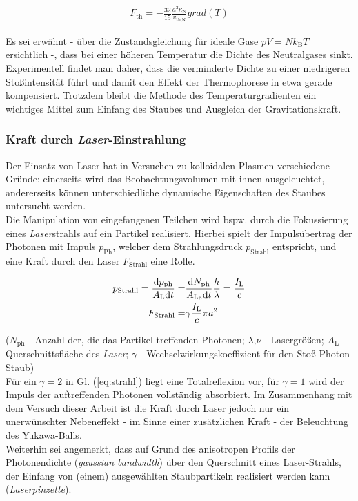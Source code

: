 \documentclass[numbers=noenddot,a4paper]{scrartcl}
\newcommand{\diff}{\textnormal{d}}
\newcommand{\ix}[1]{_\text{#1}}
\newcommand{\tilt}[1]{\textit{#1}}
\newcommand{\grad}[1]{\textit{grad}\left(#1\right)}
\begin{document}
				\begin{align}
					F\ix{th}=-\frac{32}{15}\frac{a^2 \kappa\ix{N}}{v\ix{th,N}}\grad{T} \label{eq:therm}
				\end{align}

			Es sei erwähnt -  über die Zustandsgleichung für ideale Gase $pV=Nk\ix{B}T$ ersichtlich -, dass bei einer höheren Temperatur die Dichte des Neutralgases sinkt. Experimentell findet man daher, dass die verminderte Dichte zu einer niedrigeren Stoßintensität führt und damit den Effekt der Thermophorese in etwa gerade kompensiert. Trotzdem bleibt die Methode des Temperaturgradienten ein wichtiges Mittel zum Einfang des Staubes und Ausgleich der Gravitationskraft.

		\subsubsection{Kraft durch \tilt{Laser}-Einstrahlung}\label{subsub:laser}

			Der Einsatz von Laser hat in Versuchen zu kolloidalen Plasmen verschiedene Gründe: einerseits wird das Beobachtungsvolumen mit ihnen ausgeleuchtet, andererseits können unterschiedliche dynamische Eigenschaften des Staubes untersucht werden.\\
			Die Manipulation von eingefangenen Teilchen wird bspw. durch die Fokussierung eines \tilt{Laser}strahls auf ein Partikel realisiert. Hierbei spielt der Impulsübertrag der Photonen mit Impuls $p\ix{Ph}$, welcher dem Strahlungsdruck $p\ix{Strahl}$ entspricht, und eine Kraft durch den Laser $F\ix{Strahl}$ \cite{Ashkin70} eine Rolle.

				\begin{align}
					p\ix{Strahl}=\frac{\diff p\ix{ph}}{A\ix{L}\diff t}=&\frac{\diff N\ix{ph}}{A\ix{La}\diff t}\frac{h}{\lambda}=\frac{I\ix{L}}{c} \nonumber \\
					F\ix{Strahl}=&\gamma\frac{I\ix{L}}{c}\pi a^2 \label{eq:strahl}
				\end{align}

			($N\ix{ph}$ - Anzahl der, die das Partikel treffenden Photonen; $\lambda$,$\nu$ - Lasergrößen; $A\ix{L}$ - Querschnittsfläche des \tilt{Laser}; $\gamma$ - Wechselwirkungskoeffizient für den Stoß Photon-Staub)\\
			Für ein $\gamma=2$ in Gl. (\ref{eq:strahl}) liegt eine Totalreflexion vor, für $\gamma=1$ wird der Impuls der auftreffenden Photonen vollständig absorbiert. Im Zusammenhang mit dem Versuch dieser Arbeit ist die Kraft durch Laser jedoch nur ein unerwünschter Nebeneffekt - im Sinne einer zusätzlichen Kraft - der Beleuchtung des Yukawa-Balls.\\
			Weiterhin sei angemerkt, dass auf Grund des anisotropen Profils der Photonendichte (\tilt{gaussian bandwidth}) über den Querschnitt eines Laser-Strahls, der Einfang von (einem) ausgewählten Staubpartikeln realisiert werden kann (\tilt{Laserpinzette}).
\end{document}
